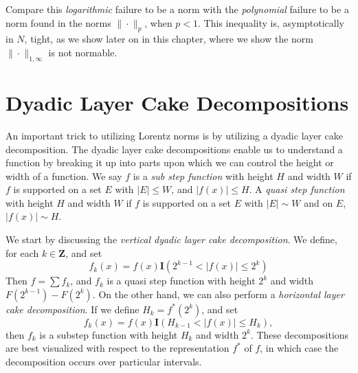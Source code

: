 Compare this \emph{logarithmic} failure to be a norm with the \emph{polynomial} failure to be a norm found in the norms $\| \cdot \|_p$, when $p < 1$. This inequality is, asymptotically in $N$, tight, as we show later on in this chapter, where we show the norm $\| \cdot \|_{1,\infty}$ is not normable.

\section{Dyadic Layer Cake Decompositions}

An important trick to utilizing Lorentz norms is by utilizing a dyadic layer cake decomposition. The dyadic layer cake decompositions enable us to understand a function by breaking it up into parts upon which we can control the height or width of a function. We say $f$ is a \emph{sub step function} with height $H$ and width $W$ if $f$ is supported on a set $E$ with $|E| \leq W$, and $|f(x)| \leq H$. A \emph{quasi step function} with height $H$ and width $W$ if $f$ is supported on a set $E$ with $|E| \sim W$ and on $E$, $|f(x)| \sim H$.

We start by discussing the \emph{vertical dyadic layer cake decomposition}. We define, for each $k \in \mathbf{Z}$, and set
%
\[ f_k(x) = f(x) \mathbf{I}(2^{k-1} < |f(x)| \leq 2^k) \]
%
Then $f = \sum f_k$, and $f_k$ is a quasi step function with height $2^k$ and width $F(2^{k-1}) - F(2^k)$. On the other hand, we can also perform a \emph{horizontal layer cake decomposition}. If we define $H_k = f^*(2^k)$, and set
%
\[ f_k(x) = f(x) \mathbf{I}(H_{k-1} < |f(x)| \leq H_k), \]
%
then $f_k$ is a substep function with height $H_k$ and width $2^k$. These decompositions are best visualized with respect to the representation $f^*$ of $f$, in which case the decomposition occurs over particular intervals.

